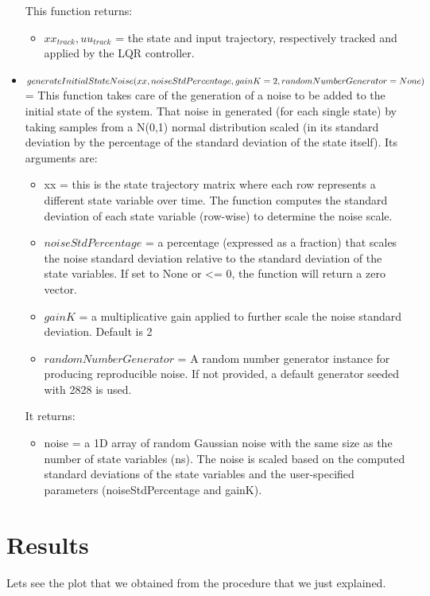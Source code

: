 \documentclass[a4paper,11pt,oneside]{book}
\begin{document}
\begin{itemize}
\begin{itemize}
    \end{itemize}
    This function returns:
    \begin{itemize}
        \item $xx_{track}, uu_{track}$ = the state and input trajectory, respectively tracked and applied by the LQR controller.
    \end{itemize}
    \item $generateInitialStateNoise(xx, noiseStdPercentage, gainK = 2,\\ randomNumberGenerator = None)$ = This function takes care of the generation of a noise to be added to the initial state of the system. That noise in generated (for each single state) by taking samples from a N(0,1) normal distribution scaled (in its standard deviation by the percentage of the standard deviation of the state itself). Its arguments are:
    \begin{itemize}
        \item xx = this is the state trajectory matrix where each row represents a different state variable over time. The function computes the standard deviation of each state variable (row-wise) to determine the noise scale.
        \item $noiseStdPercentage$ = a percentage (expressed as a fraction) that scales the noise standard deviation relative to the standard deviation of the state variables. If set to None or <= 0, the function will return a zero vector.
        \item $gainK$ = a multiplicative gain applied to further scale the noise standard deviation. Default is 2
        \item $randomNumberGenerator$ = A random number generator instance for producing reproducible noise. If not provided, a default generator seeded with 2828 is used.
    \end{itemize}
    It returns:
    \begin{itemize}
        \item noise = a 1D array of random Gaussian noise with the same size as the number of state variables (ns). The noise is scaled based on the computed standard deviations of the state variables and the user-specified parameters (noiseStdPercentage and gainK).
    \end{itemize}
\end{itemize}
\section{Results}
\begin{flushleft}
    Let\textquotesingle s see the plot that we obtained from the procedure that we just explained.
\end{flushleft}
\end{document}
